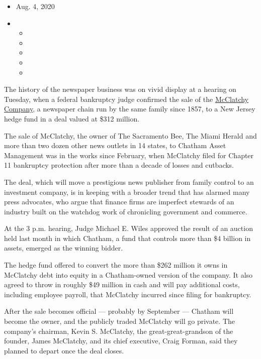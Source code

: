 \begin{itemize}
\item
  Aug. 4, 2020
\item
  \begin{itemize}
  \item
  \item
  \item
  \item
  \item
  \end{itemize}
\end{itemize}

The history of the newspaper business was on vivid display at a hearing
on Tuesday, when a federal bankruptcy judge confirmed the sale of the
\href{https://www.nytimes.com/2020/07/12/business/media/hedge-fund-mcclatchy-newspapers.html}{McClatchy
Company}, a newspaper chain run by the same family since 1857, to a New
Jersey hedge fund in a deal valued at \$312 million.

The sale of McClatchy, the owner of The Sacramento Bee, The Miami Herald
and more than two dozen other news outlets in 14 states, to Chatham
Asset Management was in the works since February, when McClatchy filed
for Chapter 11 bankruptcy protection after more than a decade of losses
and cutbacks.

The deal, which will move a prestigious news publisher from family
control to an investment company, is in keeping with a broader trend
that has alarmed many press advocates, who argue that finance firms are
imperfect stewards of an industry built on the watchdog work of
chronicling government and commerce.

At the 3 p.m. hearing, Judge Michael E. Wiles approved the result of an
auction held last month in which Chatham, a fund that controls more than
\$4 billion in assets, emerged as the winning bidder.

The hedge fund offered to convert the more than \$262 million it owns in
McClatchy debt into equity in a Chatham-owned version of the company. It
also agreed to throw in roughly \$49 million in cash and will pay
additional costs, including employee payroll, that McClatchy incurred
since filing for bankruptcy.

After the sale becomes official --- probably by September --- Chatham
will become the owner, and the publicly traded McClatchy will go
private. The company's chairman, Kevin S. McClatchy, the
great-great-grandson of the founder, James McClatchy, and its chief
executive, Craig Forman, said they planned to depart once the deal
closes.

